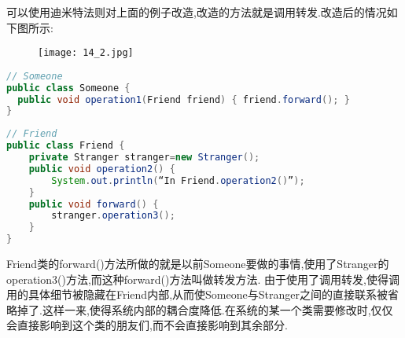 \documentclass[../main.tex]{subfiles}
\begin{document}
可以使用迪米特法则对上面的例子改造,改造的方法就是调用转发.改造后的情况如下图所示:
\begin{figure}[H]
  \texttt{[image: 14\_2.jpg]}
\end{figure}
\begin{lstlisting}[language=java]
// Someone
public class Someone {
  public void operation1(Friend friend) { friend.forward(); }
}
\end{lstlisting}
\begin{lstlisting}[language=java]
// Friend
public class Friend {
	private Stranger stranger=new Stranger();
	public void operation2() {
		System.out.println(“In Friend.operation2()”);
	}
	public void forward() {
		stranger.operation3();
	}
}
\end{lstlisting}
Friend类的forward()方法所做的就是以前Someone要做的事情,使用了Stranger的operation3()方法,而这种forward()方法叫做转发方法.
由于使用了调用转发,使得调用的具体细节被隐藏在Friend内部,从而使Someone与Stranger之间的直接联系被省略掉了.这样一来,使得系统内部的耦合度降低.在系统的某一个类需要修改时,仅仅会直接影响到这个类的朋友们,而不会直接影响到其余部分.
%
\end{document}
